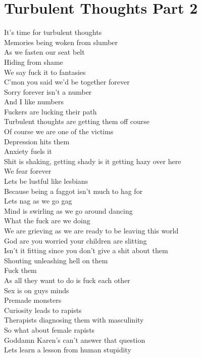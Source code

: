 \documentclass[12pt, b5paper]{article}
\begin{document}
\section{Turbulent Thoughts Part 2}
It's time for turbulent thoughts
\\Memories being woken from slumber
\\As we fasten our seat belt
\\Hiding from shame
\\We say fuck it to fantasies
\\C'mon you said we'd be together forever
\\Sorry forever isn't a number
\\And I like numbers
\\Fuckers are lucking their path
\\Turbulent thoughts are getting them off course
\\Of course we are one of the victims
\\Depression hits them
\\Anxiety fuels it
\\Shit is shaking, getting shady is it getting hazy over here
\\We fear forever
\\Lets be lustful like lesbians
\\Because being a faggot isn't much to hag for
\\Lets nag as we go gag
\\Mind is swirling as we go around dancing
\\What the fuck are we doing
\\We are grieving as we are ready to be leaving this world
\\God are you worried your children are slitting
\\Isn't it fitting since you don't give a shit about them
\\Shouting unleashing hell on them
\\Fuck them
\\As all they want to do is fuck each other
\\Sex is on guys minds
\\Premade monsters
\\Curiosity leads to rapists
\\Therapists diagnosing them with masculinity
\\So what about female rapists
\\Goddamn Karen's can't answer that question
\\Lets learn a lesson from human stupidity
\end{document}
